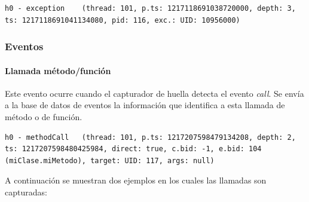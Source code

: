 \documentclass[12pt,legalpaper]{report}
\begin{document}
\begin{singlespace}
\begin{lstlisting}[style=consola,numbers=none]
h0 - exception    (thread: 101, p.ts: 1217118691038720000, depth: 3, ts: 1217118691041134080, pid: 116, exc.: UID: 10956000)
\end{lstlisting}
\end{singlespace}

			\subsubsection{Eventos}
				
				\paragraph{Llamada método/función}
				
Este evento ocurre cuando el capturador de huella detecta el evento \textit{call}.  Se envía a la base de datos de eventos la información que identifica a esta llamada de método o de función.

\begin{singlespace}
\begin{lstlisting}[style=consola,numbers=none]
h0 - methodCall   (thread: 101, p.ts: 1217207598479134208, depth: 2, ts: 1217207598480425984, direct: true, c.bid: -1, e.bid: 104 (miClase.miMetodo), target: UID: 117, args: null)
\end{lstlisting}
\end{singlespace}

A continuación se muestran dos ejemplos en los cuales las llamadas son capturadas:
\end{document}
